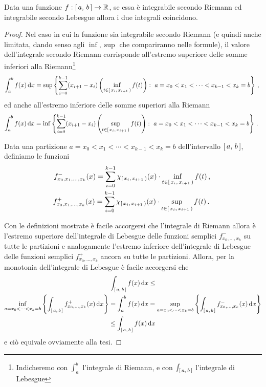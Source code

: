 \begin{proposition}\label{prop:IntegraleRiemannCoincide}
	Data una funzione $f:\left[\,a,\,b\,\right]\to \mathbb R$, se essa è integrabile secondo Riemann ed integrabile secondo Lebesgue allora i due integrali coincidono.
\end{proposition}
\begin{proof}
	Nel caso in cui la funzione sia integrabile secondo Riemann (e quindi anche limitata, dando senso agli $\inf,\sup$ che compariranno nelle formule), il valore dell'integrale secondo Riemann corrisponde all'estremo superiore delle somme inferiori alla Riemann\footnote{Indicheremo con $\int_a^b$ l'integrale di Riemann, e con $\int_{\left[\,a,\,b\,\right]}$ l'integrale di Lebesgue}
	\begin{equation*}
		\int_a^b f(x)\de x=\sup\left\{\sum_{i=0}^{k-1} (x_{i+1}-x_i)\left(\inf_{t\in\co{x_i}{x_{i+1}}}f(t)\right):\ a=x_0<x_1<\cdots<x_{k-1}<x_k=b\right\} \virgola
	\end{equation*}
	ed anche all'estremo inferiore delle somme superiori alla Riemann
	\begin{equation*}
		\int_a^b f(x)\de x=\inf\left\{\sum_{i=0}^{k-1} (x_{i+1}-x_i)\left(\sup_{t\in\co{x_i}{x_{i+1}}}f(t)\right):\ a=x_0<x_1<\cdots<x_{k-1}<x_k=b\right\} \punto
	\end{equation*}
	
	Data una partizione $a=x_0<x_1<\cdots<x_{k-1}<x_k=b$ dell'intervallo $\left[\,a,\,b\,\right]$, definiamo le funzioni
	\begin{align*}
		f^-_{x_0,x_1,\dots,x_k}(x)=\sum_{i=0}^{k-1}\chi_{\left[\,x_i,\,x_{i+1}\,\right)}(x)\cdot\inf_{t\in\left[\,x_i,\,x_{i+1}\,\right)}f(t) \, \text{, } \\
		f^+_{x_0,x_1,\dots,x_k}(x)=\sum_{i=0}^{k-1}\chi_{\left[\,x_i,\,x_{i+1}\,\right)}(x)\cdot\sup_{t\in\left[\,x_i,\,x_{i+1}\,\right)}f(t) \, \text{. }
	\end{align*}

	Con le definizioni mostrate è facile accorgersi che l'integrale di Riemann allora è l'estremo superiore dell'integrale di Lebesgue delle funzioni semplici $f^-_{x_0,\dots,x_k}$ su tutte le partizioni e analogamente l'estremo inferiore dell'integrale di Lebesgue delle funzioni semplici $f^+_{x_0,\dots,x_k}$ ancora su tutte le partizioni.
	Allora, per la monotonia dell'integrale di Lebesgue è facile accorgersi che
	\begin{multline*}
		\int_{\left[\,a,\,b\,\right]}f(x)\,\mathrm d x\le \\
		\inf_{a=x_0<\dots<x_k=b}\left\{\int_{\left[\,a,\,b\,\right]}f^+_{x_0,\dots,x_k}(x)\,\mathrm d x\right\}
		=\int_a^b f(x)\,\mathrm d x= 
		\sup_{a=x_0<\dots<x_k=b}\left\{\int_{\left[\,a,\,b\,\right]}f^-_{x_0,\dots,x_k}(x)\,\mathrm d x\right\}\\
		 \le \int_{\left[\,a,\,b\,\right]} f(x)\,\mathrm d x
	\end{multline*}
	e ciò equivale ovviamente alla tesi.
\end{proof}


